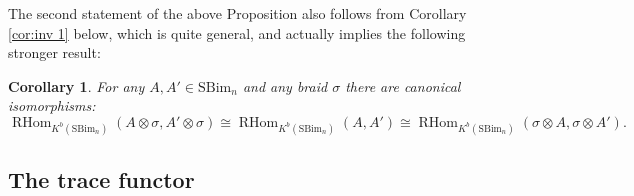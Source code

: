 \documentclass[12pt]{amsart}
\numberwithin{equation}{section}
\newtheorem{corollary}[theorem]{Corollary}
\theoremstyle{definition}
\theoremstyle{remark}
\DeclareMathOperator{\RHom}{{RHom}}
\renewcommand{\1}{\mathbf{1}}
\newcommand{\SBim}{\mathrm{SBim}}
\begin{document}
The second statement of the above Proposition also follows from Corollary \ref{cor:inv 1} below, which is quite general, and actually implies the following stronger result:

\begin{corollary}
\label{cor:twisting homs}
For any $A,A'\in \SBim_n$ and any braid $\sigma$ there are canonical isomorphisms:
$$
\RHom_{K^b(\SBim_n)}(A\otimes \sigma,A' \otimes \sigma) \cong \RHom_{K^b(\SBim_n)}(A,A') \cong \RHom_{K^b(\SBim_n)}(\sigma \otimes A,\sigma\otimes A').
$$
\end{corollary}

\subsection{The trace functor}
\label{sub:trace}
\end{document}
